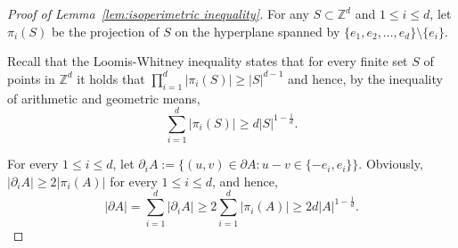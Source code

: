 \documentclass[11pt, reqno]{amsart}
\numberwithin{equation}{section}
\begin{document}
\begin{proof}[Proof of Lemma~\ref{lem:isoperimetric inequality}]
For any $S\subset\mathbb Z^d$ and $1\leq i\leq d$, let $\pi_i(S)$ be the projection of $S$ on the hyperplane spanned by $\{e_1,e_2,\ldots,e_d\}\setminus\{e_i\}$. 

Recall that the Loomis-Whitney inequality \cite{LW} states that for every finite set $S$ of points in ${\mathbb Z}^d$ it holds that
$\prod_{i=1}^d\lvert  \pi_i(S) \rvert \geq \lvert  S \rvert ^{d-1}$
and hence, by the inequality of arithmetic and geometric means,
\begin{equation}\label{eq:addLW}
\sum_{i=1}^d\lvert  \pi_i(S) \rvert \geq d\lvert  S \rvert ^{1-\frac{1}{d}}.
\end{equation}    

For every $1\leq i\leq d$, let $\partial_i A:=\{(u,v)\in\partial A\colon u-v\in\{-e_i,e_i\}\}$. Obviously, $\lvert \partial_i A\rvert\geq 2\lvert\pi_i(A)\rvert$ for every $1\leq i\leq d$, and hence,
\begin{equation*}\lvert  \partial A\rvert =\sum_{i=1}^d\lvert  \partial_i A\rvert \geq 2\sum_{i=1}^d \lvert \pi_i(A)\rvert \geq 2d\lvert  A \rvert ^{1-\frac{1}{d}}.
\end{equation*}


\end{proof}
\end{document}
